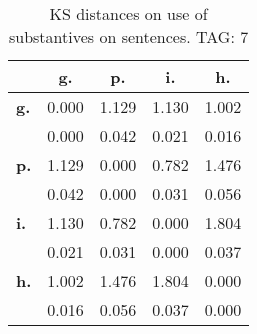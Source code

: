 \begin{table}[h!]
\begin{center}
\begin{tabular}{| l || c | c | c | c |}\hline
 & {\bf g.} & {\bf p.} & {\bf i.} & {\bf h.} \\\hline\hline
{\bf g.} & 0.000 & 1.129 & 1.130 & 1.002 \\
{\bf } & 0.000 & 0.042 & 0.021 & 0.016 \\\hline
{\bf p.} & 1.129 & 0.000 & 0.782 & 1.476 \\
{\bf } & 0.042 & 0.000 & 0.031 & 0.056 \\\hline
{\bf i.} & 1.130 & 0.782 & 0.000 & 1.804 \\
{\bf } & 0.021 & 0.031 & 0.000 & 0.037 \\\hline
{\bf h.} & 1.002 & 1.476 & 1.804 & 0.000 \\
{\bf } & 0.016 & 0.056 & 0.037 & 0.000 \\\hline
\end{tabular}
\caption{KS distances on use of substantives on sentences. TAG: 7}
\end{center}
\end{table}